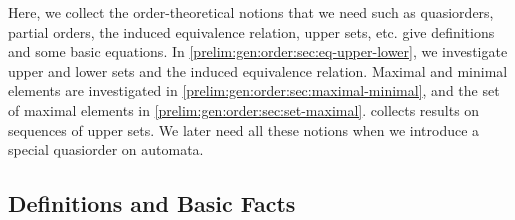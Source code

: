 
Here, we collect the order-theoretical notions that we need such 
as quasiorders, partial orders, the induced equivalence relation, upper sets, etc.
 give definitions and some basic equations. In \cref{prelim:gen:order:sec:eq-upper-lower},
we investigate upper and lower sets and the induced equivalence relation. Maximal and minimal elements are 
investigated in \cref{prelim:gen:order:sec:maximal-minimal},
and the set of maximal elements in \cref{prelim:gen:order:sec:set-maximal}.
 collects results on sequences of upper sets.
We later need all these notions when we introduce a special quasiorder on automata.

\subsection{Definitions and Basic Facts}
\label{prelim:gen:order:sec:def}

